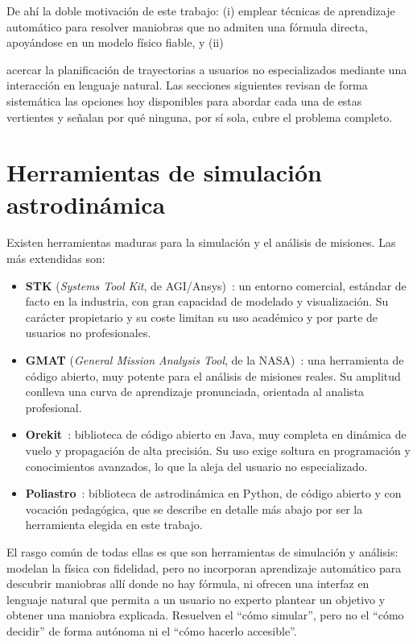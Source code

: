 De ahí la doble motivación de este trabajo: (i) emplear técnicas de aprendizaje automático para resolver maniobras que no admiten una fórmula directa, apoyándose en un modelo físico fiable, y (ii) {acercar la planificación de trayectorias a usuarios no especializados mediante una interacción en lenguaje natural. Las secciones siguientes revisan de forma sistemática las opciones hoy disponibles para abordar cada una de estas vertientes y señalan por qué ninguna, por sí sola, cubre el problema completo.

\section{Herramientas de simulación astrodinámica}
\label{sec:mot-software}

Existen herramientas maduras para la simulación y el análisis de misiones. Las más extendidas son:

\begin{itemize}
  \item \textbf{\gls{STK}} (\textit{Systems Tool Kit}, de AGI/Ansys)~\cite{stk}: un entorno comercial, estándar de facto en la industria, con gran capacidad de modelado y visualización. Su carácter propietario y su coste limitan su uso académico y por parte de usuarios no profesionales.
  \item \textbf{\gls{GMAT}} (\textit{General Mission Analysis Tool}, de la NASA)~\cite{gmat}: una herramienta de código abierto, muy potente para el análisis de misiones reales. Su amplitud conlleva una curva de aprendizaje pronunciada, orientada al analista profesional.
  \item \textbf{Orekit}~\cite{orekit}: biblioteca de código abierto en Java, muy completa en dinámica de vuelo y propagación de alta precisión. Su uso exige soltura en programación y conocimientos avanzados, lo que la aleja del usuario no especializado.
  \item \textbf{Poliastro}~\cite{poliastro}: biblioteca de astrodinámica en Python, de código abierto y con vocación pedagógica, que se describe en detalle más abajo por ser la herramienta elegida en este trabajo.
\end{itemize}

El rasgo común de todas ellas es que son herramientas de simulación y análisis: modelan la física con fidelidad, pero no incorporan aprendizaje automático para descubrir maniobras allí donde no hay fórmula, ni ofrecen una interfaz en lenguaje natural que permita a un usuario no experto plantear un objetivo y obtener una maniobra explicada. Resuelven el ``cómo simular'', pero no el ``cómo decidir'' de forma autónoma ni el ``cómo hacerlo accesible''.

}
